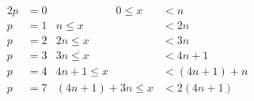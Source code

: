 \documentclass{article}
\begin{document}
\pagestyle{empty}
\begin{alignat*}{2}
p&=0 &\hspace{65pt} 0 \le x &<n\\
p&=1 & n \le x &<2n\\
p&=2 & 2n \le x &<3n\\
p&=3 & 3n \le x &<4n+1\\
p&=4 & 4n+1 \le x &<(4n+1)+n\\
p&=7 & (4n+1)+3n \le x &<2(4n+1)\\
\end{alignat*}
\end{document}
